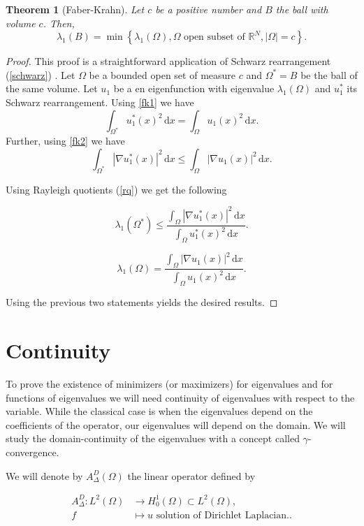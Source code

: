 \documentclass[12pt]{report}
\newtheorem{theorem}{Theorem}[section]
\numberwithin{definition}{section}
\begin{document}
\begin{theorem}[Faber-Krahn] \label{fk}
 Let $c$ be a positive number and $B$ the ball with volume $c$. Then,
 \[
   \lambda_{1}(B) = \min \left\{ \lambda_{1}(\Omega), \Omega \text{ open subset of } \mathbb{R}^{N}, |\Omega| = c \right\} 
 .\] 
\end{theorem}

\begin{proof}
  This proof is a straightforward application of Schwarz rearrangement (\ref{schwarz}) \cite{henrot}.
  Let $\Omega$ be a bounded open set of measure $c$ and $\Omega^* = B$ be the ball of the same volume.
  Let $u_1$ be a en eigenfunction with eigenvalue $\lambda_{1}(\Omega)$ and $u_1^*$ its Schwarz rearrangement.
  Using \ref{fk1} we have
  \[
   \int_{\Omega^{*}} \! u_1^{*}(x)^2 \, \mathrm{d}x = \int_{ \Omega} \! u_1(x)^2 \, \mathrm{d}x
  .\] 
  Further, using \ref{fk2} we have
  \[
     \int_{\Omega^{*}} \! | \nabla u_1^{*}(x) |^2 \, \mathrm{d}x \leq \int_\Omega \! | \nabla u_1(x)  |^2  \, \mathrm{d}x
  .\] 

  Using Rayleigh quotients (\ref{rq}) we get the following

  \[
    \lambda_{1}(\Omega^{*}) \leq \frac{\int_{\Omega} \! | \nabla u_1^{*}(x) |^2 \, \mathrm{d}x }{\int_{\Omega} \! u_1^{*}(x)^2 \, \mathrm{d}x }
  .\] 

  \[
    \lambda_{1}(\Omega) = \frac{\int_{ \Omega} \! | \nabla u_1(x) | ^2 \, \mathrm{d}x }{\int_{ \Omega} \! u_1(x)^2 \, \mathrm{d}x}
  .\] 

  Using the previous two statements yields the desired results.
\end{proof}

\break

\section{Continuity}
To prove the existence of minimizers (or maximizers) for eigenvalues and for functions of eigenvalues we will need continuity of eigenvalues with respect to the variable.
While the classical case is when the eigenvalues depend on the coefficients of the operator, our eigenvalues will depend on the domain.
We will study the domain-continuity of the eigenvalues with a concept called $\gamma$-convergence.

We will denote by $A_{\Delta}^{D}(\Omega)$ the linear operator defined by 

\begin{align*}
  A_{\Delta}^{D} : L^{2}(\Omega) &\to H_{0}^{1}(\Omega) \subset L^{2}(\Omega), \\
  f &\mapsto u \text{ solution of Dirichlet Laplacian}.
.\end{align*}
\end{document}
